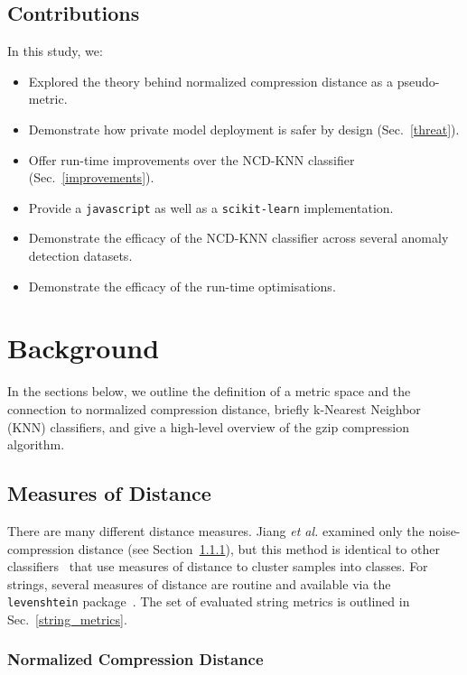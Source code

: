 \documentclass[conference]{IEEEtran}
\begin{document}
\subsection{Contributions}
In this study, we:

\begin{itemize}
    \item Explored the theory behind normalized compression distance as a pseudo-metric.
    \item Demonstrate how private model deployment is safer by design (Sec.~\ref{threat}).
    \item Offer run-time improvements over the NCD-KNN classifier (Sec.~\ref{improvements}).
    \item Provide a \texttt{javascript} as well as a \texttt{scikit-learn} implementation.
    \item Demonstrate the efficacy of the NCD-KNN classifier across several anomaly detection datasets.
    \item Demonstrate the efficacy of the run-time optimisations.
\end{itemize}





\section{Background}

In the sections below, we outline the definition of a metric space and the connection to normalized compression distance, briefly k-Nearest Neighbor (KNN) classifiers, and give a high-level overview of the gzip compression algorithm.



\subsection{Measures of Distance}

There are many different distance measures. Jiang \textit{et al.} examined only the noise-compression distance (see Section~\ref{ncd}), but this method is identical to other classifiers~\cite{vapnik1994measuring} that use measures of distance to cluster samples into classes. For strings, several measures of distance are routine and available via the \texttt{levenshtein} package~\cite{levenshtein}. The set of evaluated string metrics is outlined in Sec.~\ref{string_metrics}.



\subsubsection{Normalized Compression Distance}
\label{ncd}
\end{document}
